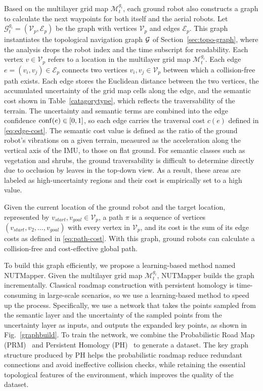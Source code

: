 Based on the multilayer grid map $\mathcal{M}^{g_i}_t$, each ground robot also constructs a graph to calculate the next waypoints for both itself and the aerial robots. Let $\mathcal{G}^{g_i}_t = (\mathcal{V}_p, \mathcal{E}_p)$ be the graph with vertices $\mathcal{V}_p$ and edges $\mathcal{E}_p$. This graph instantiates the topological navigation graph $\mathcal{G}$ of Section~\ref{sec:topo-graph}, where the analysis drops the robot index and the time subscript for readability. Each vertex $v \in \mathcal{V}_p$ refers to a location in the multilayer grid map $\mathcal{M}^{g_i}_t$. Each edge $e = (v_i, v_j) \in \mathcal{E}_p$ connects two vertices $v_i, v_j \in \mathcal{V}_p$ between which a collision-free path exists. Each edge stores the Euclidean distance between the two vertices, the accumulated uncertainty of the grid map cells along the edge, and the semantic cost shown in Table~\ref{catagorytype}, which reflects the traversability of the terrain. The uncertainty and semantic terms are combined into the edge confidence $\mathrm{conf}(e) \in [0, 1]$, so each edge carries the traversal cost $c(e)$ defined in \eqref{eq:edge-cost}. The semantic cost value is defined as the ratio of the ground robot's vibrations on a given terrain, measured as the acceleration along the vertical axis of the IMU, to those on flat ground. For semantic classes such as vegetation and shrubs, the ground traversability is difficult to determine directly due to occlusion by leaves in the top-down view. As a result, these areas are labeled as high-uncertainty regions and their cost is empirically set to a high value.

Given the current location of the ground robot and the target location, represented by $v_{start}, v_{goal} \in \mathcal{V}_p$, a path $\pi$ is a sequence of vertices $(v_{start}, v_2, \dots, v_{goal})$ with every vertex in $\mathcal{V}_p$, and its cost is the sum of its edge costs as defined in \eqref{eq:path-cost}. With this graph, ground robots can calculate a collision-free and cost-effective global path.

To build this graph efficiently, we propose a learning-based method named NUTMapper. Given the multilayer grid map $\mathcal{M}^{g_i}_t$, NUTMapper builds the graph incrementally. Classical roadmap construction with persistent homology is time-consuming in large-scale scenarios, so we use a learning-based method to speed up the process. Specifically, we use a network that takes the points sampled from the semantic layer and the uncertainty of the sampled points from the uncertainty layer as inputs, and outputs the expanded key points, as shown in Fig.~\ref{graphbuild}. To train the network, we combine the Probabilistic Road Map (PRM)~\cite{kavraki1996probabilistic, karaman2011sampling} and Persistent Homology (PH)~\cite{otter2017roadmap, fritzke1994growing} to generate a dataset. The key graph structure produced by PH helps the probabilistic roadmap reduce redundant connections and avoid ineffective collision checks, while retaining the essential topological features of the environment, which improves the quality of the dataset.

